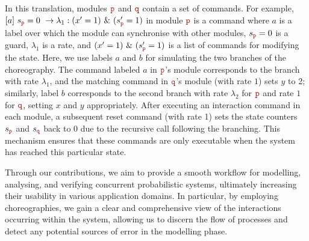 %
In this translation, modules $\nr$ and $\nrr$ contain a set of
commands. For example,
$\commandBase {a}{s_{\role p}=0} {\lambda_1:(x'=1)\ \&\ (s_{\role
    p}'=1)}$ in module $\nr$ is a command where $a$ is a label over
which the module can synchronise with other modules, $s_{\role p}=0$
is a guard, $\lambda_1$ is a rate, and $(x'=1)\ \&\ (s_{\role p}'=1)$
is a list of commands for modifying the state. Here, we use labels $a$
and $b$ for simulating the two branches of the choreography.
%
The command labeled \(a\) in \(\role{p}\)’s module corresponds to the
branch with rate \(\lambda_1\), and the matching command in
\(\role{q}\)’s module (with rate \(1\)) sets \(y\) to 2; similarly,
label \(b\) corresponds to the second branch with rate \(\lambda_2\)
for \(\role{p}\) and rate \(1\) for \(\role{q}\), setting \(x\) and
\(y\) appropriately.  After executing an interaction command in each
module, a subsequent reset command (with rate 1) sets the state
counters \( s_{\role p} \) and \( s_{\role q} \) back to 0 due to the
recursive call following the branching. This mechanism ensures that
these commands are only executable when the system has reached this
particular state.



Through our contributions, we aim to provide a smooth workflow for
modelling, analysing, and verifying concurrent probabilistic systems,
ultimately increasing their usability in various application domains.
%
In particular, by employing choreographies, we gain a clear and
comprehensive view of the interactions occurring within the system,
allowing us to discern the flow of processes and detect any potential
sources of error in the modelling phase.


